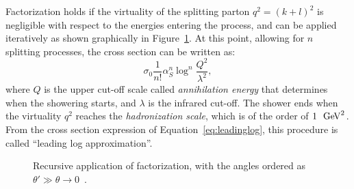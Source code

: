 Factorization holds if the virtuality of the splitting parton $q^2 = (k+l)^2$ 
is negligible with respect to the energies entering the process, and 
can be applied iteratively as shown graphically in Figure~\ref{fig:factorization2}.
At this point, allowing for $n$ splitting processes, the cross section can be written as:
\begin{equation}
  \label{eq:leadinglog} 
  \sigma_0 \frac{1}{n!} \alpha_S^n \log^n
  \frac{Q^2}{\lambda^2},
\end{equation}
where $Q$ is the upper cut-off scale called {\it annihilation energy} that determines
when the showering starts, and $\lambda$ is the infrared cut-off. The shower ends
when the virtuality $q^2$ reaches the {\it hadronization scale}, which is of the
order of $1~\gev^2$. From the cross section expression of Equation~\ref{eq:leadinglog},
this procedure is called ``leading log approximation''.

\begin{figure}[tb]\begin{center}
	\caption{Recursive application of factorization, with the angles ordered
        as  $\theta' \gg \theta \rightarrow 0$~\cite{Ambroglini:2009nz}.\label{fig:factorization2}}
\end{center}\end{figure}

